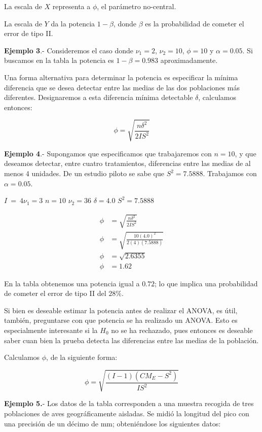 \documentclass[]{book}
\theoremstyle{definition}
\theoremstyle{definition}
\theoremstyle{definition}
\theoremstyle{remark}
\begin{document}
La escala de \(X\) representa a \(\phi\), el parámetro no-central.

La escala de \(Y\) da la potencia \(1 - \beta\), donde \(\beta\) es la
probabilidad de cometer el error de tipo II.

\textbf{Ejemplo 3}.- Consideremos el caso donde \(\nu_{1} = 2\),
\(\nu_{2} = 10\), \(\phi = 10\) y \(\alpha = 0.05\). Si buscamos en la
tabla la potencia es \(1 - \beta = 0.983\) aproximadamente.

Una forma alternativa para determinar la potencia es especificar la
mínima diferencia que se desea detectar entre las medias de las dos
poblaciones más diferentes. Designaremos a esta diferencia mínima
detectable \(\delta\), calculamos entonces:

\[
\phi = \sqrt{\frac{n\delta^{2}}{2IS^{2}}}
\]

\textbf{Ejemplo 4}.- Supongamos que especificamos que trabajaremos con
\(n = 10\), y que deseamos detectar, entre cuatro tratamientos,
diferencias entre las medias de al menos 4 unidades. De un estudio
piloto se sabe que \(S^{2} = 7.5888\). Trabajamos con \(\alpha = 0.05\).

\(I\  = \ 4\nu_{1} = 3\) \(n = 10\) \(\nu_{2} = 36\) \(\delta = 4.0\)
\(S^{2} = 7.5888\)

\[
\begin{aligned}
\phi &= \sqrt{\frac{n\delta^{2}}{2IS^{2}}}\\
\phi &= \sqrt{\frac{10\left( 4.0 \right)^{2}}{2\left( 4 \right)\left( 7.5888 \right)}}\\
\phi &= \sqrt{2.6355}\\
\phi &= 1.62
\end{aligned}
\]

En la tabla obtenemos una potencia igual a \(0.72\); lo que implica una
probabilidad de cometer el error de tipo II del \(28\%\).

Si bien es deseable estimar la potencia antes de realizar el ANOVA, es
útil, también, preguntarse con que potencia se ha realizado un ANOVA.
Esto es especialmente interesante si la \(H_{0}\) no se ha rechazado,
pues entonces es deseable saber cuan bien la prueba detecta las
diferencias entre las medias de la población.

Calculamos \(\phi\), de la siguiente forma:

\[
\phi = \sqrt{\frac{\left( I - 1 \right)\left( CM_E - S^{2} \right)}{IS^{2}}}
\]

\textbf{Ejemplo 5.}- Los datos de la tabla corresponden a una muestra
recogida de tres poblaciones de aves geográficamente aisladas. Se midió
la longitud del pico con una precisión de un décimo de mm; obteniéndose
los siguientes datos:
\end{document}
